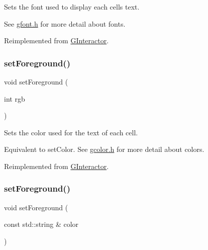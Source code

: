 Sets the font used to display each cell\textquotesingle{}s text. 

See \mbox{\hyperlink{gfont_8h_source}{gfont.\+h}} for more detail about fonts. 

Reimplemented from \mbox{\hyperlink{classGInteractor_a8e096e8818d838aceae1d46d58fb3a7b}{G\+Interactor}}.

\mbox{\label{classGTable_af9227e80cbfac55ce936fa5c99ffc954}} 
\subsubsection{\texorpdfstring{set\+Foreground()}{setForeground()}\hspace{0.1cm}{\footnotesize\ttfamily [1/2]}}
{\footnotesize\ttfamily void set\+Foreground (\begin{DoxyParamCaption}\item[{int}]{rgb }\end{DoxyParamCaption})\hspace{0.3cm}{\ttfamily [virtual]}}



Sets the color used for the text of each cell. 

Equivalent to set\+Color. See \mbox{\hyperlink{gcolor_8h_source}{gcolor.\+h}} for more detail about colors. 

Reimplemented from \mbox{\hyperlink{classGInteractor_a9eb856b5ff83a19df3831a31f15f4563}{G\+Interactor}}.

\mbox{\label{classGTable_a088e04dfc56273df4cedab2b11b970f5}} 
\subsubsection{\texorpdfstring{set\+Foreground()}{setForeground()}\hspace{0.1cm}{\footnotesize\ttfamily [2/2]}}
{\footnotesize\ttfamily void set\+Foreground (\begin{DoxyParamCaption}\item[{const std\+::string \&}]{color }\end{DoxyParamCaption})\hspace{0.3cm}{\ttfamily [virtual]}}



